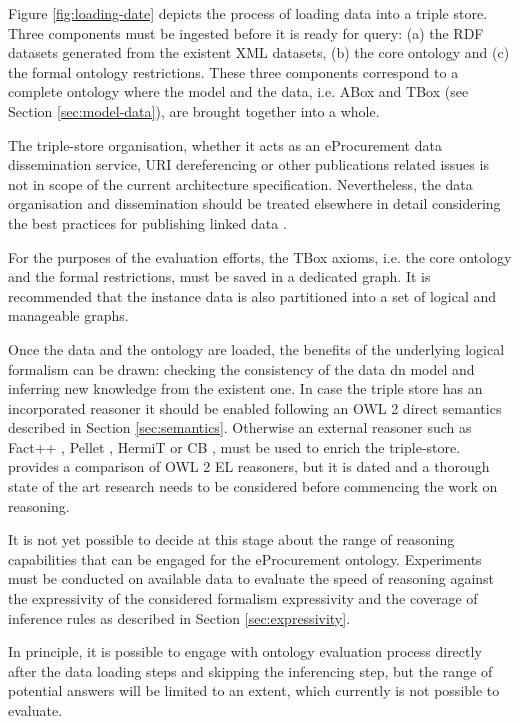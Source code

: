 	Figure \ref{fig:loading-date} depicts the process of loading data into a triple store. Three components must be ingested before it is ready for query: (a) the RDF datasets generated from the existent XML datasets, (b) the core ontology and (c) the formal ontology restrictions. These three components correspond to a complete ontology where the model and the data, i.e. ABox and TBox (see Section \ref{sec:model-data}), are brought together into a whole.
	
	The triple-store organisation, whether it acts as an eProcurement data dissemination service, URI dereferencing or other publications related issues is not in scope of the current architecture specification. Nevertheless, the data organisation and dissemination should be treated elsewhere in detail considering the best practices for publishing linked data \cite{bizer2009emerging}.
	
	For the purposes of the evaluation efforts, the TBox axioms, i.e. the core ontology and the formal restrictions, must be saved in a dedicated graph.  It is recommended that the instance data is also partitioned into a set of logical and manageable graphs.  

	Once the data and the ontology are loaded, the benefits of the underlying logical formalism can be drawn: checking the consistency of the data dn model and inferring new knowledge from the existent one. In case the triple store has an incorporated reasoner it should be enabled following an OWL 2 direct semantics described in Section \ref{sec:semantics}. Otherwise an external reasoner such as Fact++ \cite{tsarkov2006fact++}, Pellet \cite{sirin2007pellet}, HermiT \cite{shearer2008hermit} or CB \cite{kazakov2009consequence}, must be used to enrich the triple-store. \citet{dentler2011comparison} provides a comparison of OWL 2 EL reasoners, but it is dated and a thorough state of the art research needs to be considered before commencing the work on reasoning. 
	
	It is not yet possible to decide at this stage about the range of reasoning capabilities that can be engaged for the eProcurement ontology. Experiments must be conducted on available data to evaluate the speed of reasoning against the expressivity of the considered formalism expressivity and the coverage of inference rules as described in Section \ref{sec:expressivity}.
	
	In principle, it is possible to engage with ontology evaluation process directly after the data loading steps and skipping the inferencing step, but the range of potential answers will be limited to an extent, which currently is not possible to evaluate.
		
